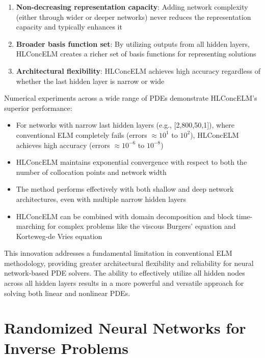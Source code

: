 \documentclass[11pt]{article}
\begin{document}
\begin{enumerate}
    \item \textbf{Non-decreasing representation capacity}: Adding network complexity (either through wider or deeper networks) never reduces the representation capacity and typically enhances it
    
    \item \textbf{Broader basis function set}: By utilizing outputs from all hidden layers, HLConcELM creates a richer set of basis functions for representing solutions
    
    \item \textbf{Architectural flexibility}: HLConcELM achieves high accuracy regardless of whether the last hidden layer is narrow or wide
\end{enumerate}

Numerical experiments across a wide range of PDEs demonstrate HLConcELM's superior performance:

\begin{itemize}
    \item For networks with narrow last hidden layers (e.g., [2,800,50,1]), where conventional ELM completely fails (errors $\approx 10^1$ to $10^2$), HLConcELM achieves high accuracy (errors $\approx 10^{-6}$ to $10^{-8}$)
    
    \item HLConcELM maintains exponential convergence with respect to both the number of collocation points and network width
    
    \item The method performs effectively with both shallow and deep network architectures, even with multiple narrow hidden layers
    
    \item HLConcELM can be combined with domain decomposition and block time-marching for complex problems like the viscous Burgers' equation and Korteweg-de Vries equation
\end{itemize}

This innovation addresses a fundamental limitation in conventional ELM methodology, providing greater architectural flexibility and reliability for neural network-based PDE solvers. The ability to effectively utilize all hidden nodes across all hidden layers results in a more powerful and versatile approach for solving both linear and nonlinear PDEs.

\section{Randomized Neural Networks for Inverse Problems}
\end{document}

